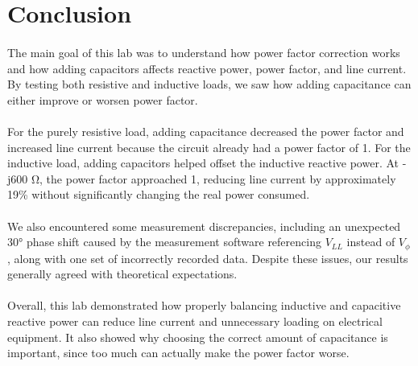 \documentclass[hidelinks, letterpaper,11pt,headheight=10mm]{texMemo}
\begin{document}
\section{Conclusion}

\paragraph{}The main goal of this lab was to understand how power
factor correction works and how adding
capacitors affects reactive power, power factor, and line current. By
testing both resistive and inductive loads,
we saw how adding capacitance can either improve or worsen power factor.

\paragraph{}For the purely resistive load, adding capacitance
decreased the power factor and increased line current
because the circuit already had a power factor of 1. For the
inductive load, adding capacitors helped offset the inductive
reactive power. At -j600 Ω, the power factor approached 1, reducing
line current by approximately 19\% without
significantly changing the real power consumed.

\paragraph{}We also encountered some measurement discrepancies,
including an unexpected 30° phase shift caused
by the measurement software referencing $V_{LL}$ instead of $V_\phi$,
along with one set of incorrectly recorded data.
Despite these issues, our results generally agreed with theoretical
expectations.

\paragraph{}Overall, this lab demonstrated how properly balancing
inductive and capacitive reactive power can reduce
line current and unnecessary loading on electrical equipment. It also
showed why choosing the correct amount of capacitance
is important, since too much can actually make the power factor worse.
\end{document}
